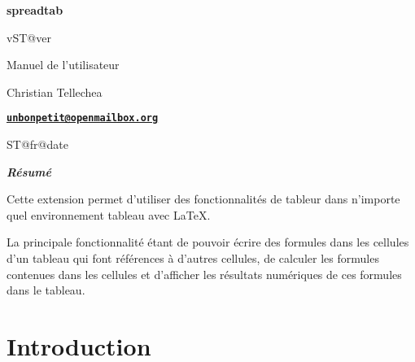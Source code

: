 \documentclass[a4paper,10pt]{article}
\newcommand\ST{\textsf{spreadtab}\xspace}
\begin{document}
\parindent0pt\pagestyle{fancy}\STsetdecimalsep{,}
\begin{titlepage}
	\null\par\vfill
	\begin{center}
		\begin{minipage}{0.75\linewidth}
			\begin{center}
				\Huge\bfseries\ST\par\vspace{5pt}
				\small v\csname ST@ver\endcsname\par\vspace{35pt}
				\normalsize Manuel de l'utilisateur
			\end{center}
		\end{minipage}
	\end{center}
	\vspace{1cm}
	\begin{center}
		Christian {\sc Tellechea}\par\small
		\href{mailto:unbonpetit@openmailbox.org}{\texttt{\textbf{unbonpetit@openmailbox.org}}}\par\vspace{5pt}
		\csname ST@fr@date\endcsname
	\end{center}
	\vfill
	\begin{center}
		\begin{minipage}{0.8\linewidth}
			\noindent\hrulefill\par
			\hfill\textbf{\textit{Résumé}}\hfill{}\medskip\par\footnotesize
				Cette extension permet d'utiliser des fonctionnalités de tableur dans n'importe quel environnement \og tableau\fg{} avec \LaTeX{}.\par\smallskip
				La principale fonctionnalité étant de pouvoir écrire des formules dans les cellules d'un tableau qui font références à d'autres cellules, de calculer les formules contenues dans les cellules et d'afficher les résultats numériques de ces formules dans le tableau.\par
			\hrulefill
		\end{minipage}
	\end{center}
	\vfill{}
\end{titlepage}

\tableofcontents\newpage
\parskip\medskipamount
\section{Introduction}
\end{document}
